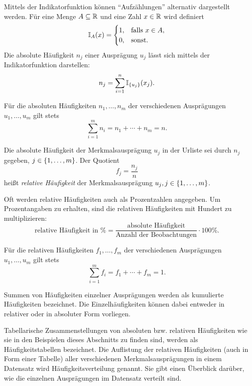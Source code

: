 \documentclass{lecture}
\begin{document}
    Mittels der Indikatorfunktion können ``Aufzählungen'' alternativ dargestellt werden.
    Für eine Menge \(A \subseteq \R\) und eine Zahl \(x \in \R\) wird definiert
    \[
        \mathbb{I}_A\parentheses*{x} = \begin{cases}
            1, & \text{falls }x \in A,\\
            0, & \text{sonst.}
        \end{cases}
    \]
    Die absolute Häufigkeit \(n_j\) einer Ausprägung \(u_j\) lässt sich mittels der Indikatorfunktion darstellen:
    \[
        n_j = \sum_{i = 1}^n \mathbb{I}_{\braces*{u_j}}\parentheses*{x_j}.
    \]

    \begin{calcrule}
        Für die absoluten Häufigkeiten \(n_1, \ldots, n_m\) der verschiedenen Ausprägungen \(u_1, \ldots, u_m\) gilt stets
        \[
            \sum_{i = 1}^m n_i = n_1 + \cdots + n_m = n.
        \]
    \end{calcrule}

    \begin{definition}
        Die absolute Häufigkeit der Merkmalsausprägung \(u_j\) in der Urliste sei durch \(n_j\) gegeben, \(j \in \braces*{1, \ldots, m}\).
        Der Quotient
        \[
            f_j = \frac{n_j}{n}
        \]
        heißt \emph{relative Häufigkeit} der Merkmalsausprägung \(u_j, j \in \braces*{1, \ldots, m}\).
    \end{definition}

    Oft werden relative Häufigkeiten auch als Prozentzahlen angegeben.
    Um Prozentangaben zu erhalten, sind die relativen Häufigkeiten mit Hundert zu multiplizieren:
    \[
        \text{relative Häufigkeit in \%} = \frac{\text{absolute Häufigkeit}}{\text{Anzahl der Beobachtungen}} \cdot 100\%.
    \]

    \begin{calcrule}
        Für die relativen Häufigkeiten \(f_1, \ldots, f_m\) der verschiedenen Ausprägungen \(u_1, \ldots, u_m\) gilt stets
        \[
            \sum_{i = 1}^m f_i = f_1 + \cdots + f_m = 1.
        \]
    \end{calcrule}
    
    Summen von Häufigkeiten einzelner Ausprägungen werden als kumulierte Häufigkeiten bezeichnet.
    Die Einzelhäufigkeiten können dabei entweder in relativer oder in absoluter Form vorliegen.

    Tabellarische Zusammenstellungen von absoluten bzw. relativen Häufigkeiten wie sie in den Beispielen dieses Abschnitts zu finden sind, werden als Häufigkeitstabellen bezeichnet.
    Die Auflistung der relativen Häufigkeiten (auch in Form einer Tabelle) aller verschiedenen Merkmalsausprägungen in einem Datensatz wird Häufigkeitsverteilung genannt.
    Sie gibt einen Überblick darüber, wie die einzelnen Ausprägungen im Datensatz verteilt sind.
    
\end{document}
